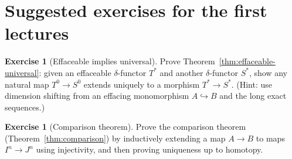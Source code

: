 \documentclass[11pt]{article}
\theoremstyle{definition}
\newtheorem{exercise}[definition]{Exercise}
\theoremstyle{plain}
\begin{document}
\section{Suggested exercises for the first lectures}

\begin{exercise}[Effaceable implies universal]\label{ex:effaceable-universal}
Prove Theorem~\ref{thm:effaceable-universal}:
given an effaceable $\delta$-functor $T^\ast$ and another $\delta$-functor $S^\ast$, show any natural map $T^0\to S^0$ extends uniquely to a morphism $T^\ast\to S^\ast$.
(Hint: use dimension shifting from an effacing monomorphism $A\hookrightarrow B$ and the long exact sequences.)
\end{exercise}

\begin{exercise}[Comparison theorem]\label{ex:comparison}
Prove the comparison theorem (Theorem~\ref{thm:comparison}) by inductively extending a map $A\to B$ to maps $I^n\to J^n$ using injectivity, and then proving uniqueness up to homotopy.
\end{exercise}
\end{document}
